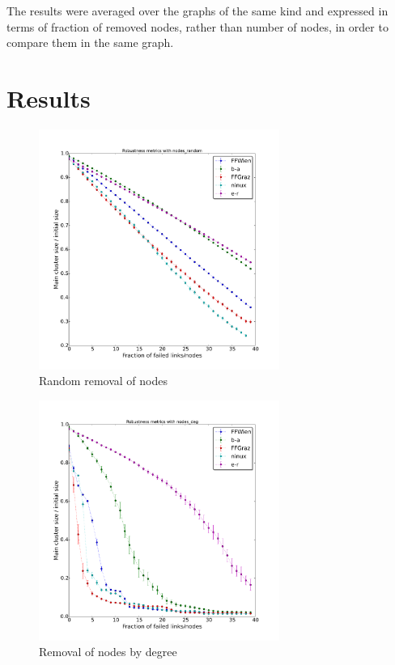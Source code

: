 \documentclass[a4paper,11pt,twoside,openright]{memoir}
\begin{document}
The results were averaged over the graphs of the same kind and expressed
in terms of fraction of removed nodes, rather than number of nodes, in
order to compare them in the same graph.

\section{Results}\label{results}

\begin{figure}[htbp]
\centering
\includegraphics[width=0.7\textwidth]{graphs/nodes_random_robustness}
\caption{Random removal of nodes}
\label{fig:node_rand}
\end{figure}

\begin{figure}[htbp]
\centering
\includegraphics[width=0.7\textwidth]{graphs/nodes_deg_robustness}
\caption{Removal of nodes by degree}
\label{fig:node_deg}
\end{figure}
\end{document}

